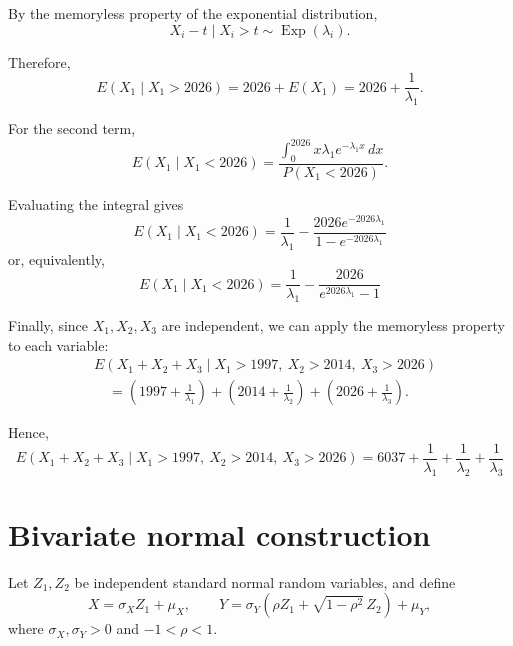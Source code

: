 \documentclass[11pt,a4paper]{article}
\begin{document}
By the memoryless property of the exponential distribution,
\[
X_i-t \mid X_i>t \sim \operatorname{Exp}(\lambda_i).
\]

Therefore,
\[
E(X_1\mid X_1>2026)
=2026+E(X_1)
=\boxed{2026+\frac{1}{\lambda_1}}.
\]

For the second term,
\[
E(X_1\mid X_1<2026)
=
\frac{\displaystyle\int_0^{2026}x\lambda_1e^{-\lambda_1x}\,dx}
{P(X_1<2026)}.
\]

Evaluating the integral gives
\[
E(X_1\mid X_1<2026)
=
\frac{1}{\lambda_1}
-\frac{2026e^{-2026\lambda_1}}
{1-e^{-2026\lambda_1}}
\]
or, equivalently,
\[
E(X_1\mid X_1<2026)
=
\frac{1}{\lambda_1}
-\frac{2026}{e^{2026\lambda_1}-1}
\]

Finally, since \(X_1,X_2,X_3\) are independent, we can apply the memoryless property to each variable:
\[
\begin{aligned}
&E(X_1+X_2+X_3
\mid X_1>1997,\ X_2>2014,\ X_3>2026)\\
&\quad=
\left(1997+\frac{1}{\lambda_1}\right)
+\left(2014+\frac{1}{\lambda_2}\right)
+\left(2026+\frac{1}{\lambda_3}\right).
\end{aligned}
\]

Hence,
\[
E(X_1+X_2+X_3
\mid X_1>1997,\ X_2>2014,\ X_3>2026)
=
6037+\frac{1}{\lambda_1}
+\frac{1}{\lambda_2}
+\frac{1}{\lambda_3}
\]
\section{Bivariate normal construction}
Let \(Z_1,Z_2\) be independent standard normal random variables, and define
\[
X=\sigma_X Z_1+\mu_X,
\qquad
Y=\sigma_Y\left(\rho Z_1+\sqrt{1-\rho^2}\,Z_2\right)+\mu_Y,
\]
where \(\sigma_X,\sigma_Y>0\) and \(-1<\rho<1\).
\end{document}

